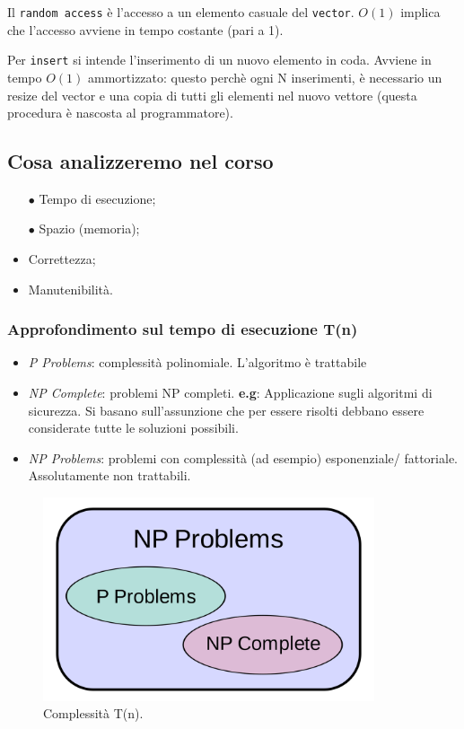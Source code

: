 Il \texttt{random access} è l'accesso a un elemento casuale del \texttt{vector}. 
$O(1)$ implica che l'accesso avviene in tempo costante (pari a 1). \par
Per \texttt{insert} si intende l'inserimento di un nuovo elemento in coda. 
Avviene in tempo $O(1)$ ammortizzato: questo perchè ogni N inserimenti, è 
necessario un resize del vector e una copia di tutti gli elementi nel nuovo vettore
(questa procedura è nascosta al programmatore).

\subsection{Cosa analizzeremo nel corso}

\begin{itemize}
	\item[$\bullet$] Tempo di esecuzione;
	\item[$\bullet$] Spazio (memoria);
	\medskip
	\item Correttezza;
	\item Manutenibilità.
\end{itemize}

\subsubsection{Approfondimento sul tempo di esecuzione T(n)}

\begin{itemize}
	\item \textit{P Problems}: complessità polinomiale. L'algoritmo è trattabile
	\item \textit{NP Complete}: problemi NP completi. \textbf{e.g}: Applicazione sugli algoritmi di sicurezza. Si basano sull'assunzione che per essere risolti debbano essere considerate tutte le soluzioni possibili.
	\item \textit{NP Problems}: problemi con complessità  (ad esempio) esponenziale/ fattoriale. Assolutamente non trattabili.
\end{itemize}

\begin{figure}[htb]
	\centering
	\includegraphics[height=6cm]{img/algorithm-complexity.png}
	\caption{Complessità T(n).}	
\end{figure}
	
